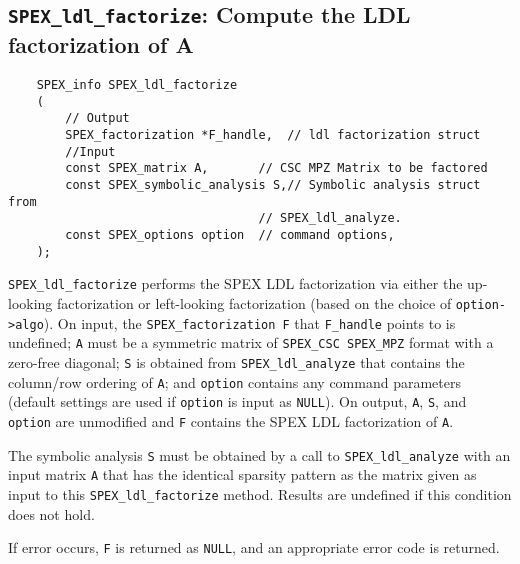 \documentclass[12pt,oneside]{book}
\theoremstyle{definition}
\begin{document}
\subsection{\texttt{SPEX\_ldl\_factorize}: Compute the LDL factorization of A} \label{ss:spex_ldl_factorize}
\begin{mdframed}[userdefinedwidth=\textwidth]
{\footnotesize
\begin{verbatim}
    SPEX_info SPEX_ldl_factorize
    (
        // Output
        SPEX_factorization *F_handle,  // ldl factorization struct
        //Input
        const SPEX_matrix A,       // CSC MPZ Matrix to be factored   
        const SPEX_symbolic_analysis S,// Symbolic analysis struct from
                                   // SPEX_ldl_analyze.
        const SPEX_options option  // command options, 
    );
\end{verbatim}
} \end{mdframed}

\verb|SPEX_ldl_factorize| performs the SPEX LDL factorization via either the 
up-looking factorization or left-looking factorization (based on the choice of \verb|option->algo|).
On input, the \verb|SPEX_factorization F| that \verb|F_handle| points to is undefined; \verb|A| must be a symmetric matrix of \verb|SPEX_CSC SPEX_MPZ| format with a zero-free diagonal; \verb|S| is obtained from \verb|SPEX_ldl_analyze| that contains the column/row ordering of \verb|A|; and \verb|option| contains any command parameters   (default settings are used if
\verb|option| is input as \verb|NULL|). On output, \verb|A|, \verb|S|, and \verb|option| are unmodified and \verb|F| contains the SPEX LDL factorization of \verb|A|.

The symbolic analysis \verb'S' must be obtained by a call
to \verb'SPEX_ldl_analyze' with an input matrix \verb'A'
that has the identical sparsity pattern as the matrix given
as input to this \verb'SPEX_ldl_factorize' method.  Results are undefined if this condition does not hold.

If error occurs, \verb|F| is returned as \verb|NULL|, and an appropriate error code is returned.

\end{document}
